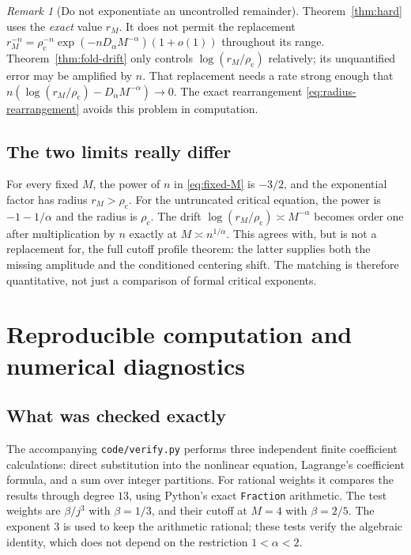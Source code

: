 \documentclass[11pt,a4paper]{article}
\numberwithin{equation}{section}
\theoremstyle{definition}
\theoremstyle{remark}
\newtheorem{remark}[theorem]{Remark}
\newcommand{\rhoc}{\rho_{\mathrm c}}
\begin{document}
\begin{remark}[Do not exponentiate an uncontrolled remainder]
Theorem~\ref{thm:hard} uses the \emph{exact} value $r_M$. It does not
permit the replacement
$r_M^{-n}=\rhoc^{-n}\exp(-nD_\alpha M^{-\alpha})(1+o(1))$
throughout its range. Theorem~\ref{thm:fold-drift} only controls
$\log(r_M/\rhoc)$ relatively; its unquantified error may be amplified by
$n$. That replacement needs a rate strong enough that
$n\left(\log(r_M/\rhoc)-D_\alpha M^{-\alpha}\right)\to0$.
The exact rearrangement \eqref{eq:radius-rearrangement} avoids this
problem in computation.
\end{remark}

\subsection{The two limits really differ}
For every fixed $M$, the power of $n$ in \eqref{eq:fixed-M} is $-3/2$,
and the exponential factor has radius $r_M>\rhoc$. For the untruncated
critical equation, the power is $-1-1/\alpha$ and the radius is $\rhoc$.
The drift $\log(r_M/\rhoc)\asymp M^{-\alpha}$ becomes order one after
multiplication by $n$ exactly at $M\asymp n^{1/\alpha}$. This agrees
with, but is not a replacement for, the full cutoff profile theorem:
the latter supplies both the missing amplitude and the conditioned
centering shift. The matching is therefore quantitative, not just a
comparison of formal critical exponents.

\section{Reproducible computation and numerical diagnostics}
\label{sec:computation}

\subsection{What was checked exactly}
The accompanying \texttt{code/verify.py} performs three independent
finite coefficient calculations: direct substitution into the nonlinear
equation, Lagrange's coefficient formula, and a sum over integer
partitions. For rational weights it compares the results through degree
$13$, using Python's exact \texttt{Fraction} arithmetic. The test weights
are $\beta/j^3$ with $\beta=1/3$, and their cutoff at $M=4$ with
$\beta=2/5$. The exponent $3$ is used to keep the arithmetic rational;
these tests verify the algebraic identity, which does not depend on the
restriction $1<\alpha<2$.
\end{document}
